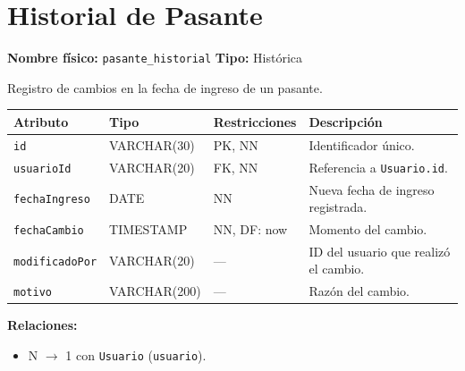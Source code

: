 \documentclass[12pt,a4paper]{article}
\newenvironment{tabladesc}[3]{%
  \section{#1}
  \textbf{Nombre físico:} \texttt{#2} \hfill \textbf{Tipo:} #3\par
  \medskip
}{%
  \bigskip
}
\begin{document}
\begin{tabladesc}{Historial de Pasante}{pasante\_historial}{Histórica}

Registro de cambios en la fecha de ingreso de un pasante.

\bigskip
\begin{longtable}{L{3.5cm} L{2.5cm} L{2cm} L{7.5cm}}
\toprule
\textbf{Atributo} & \textbf{Tipo} & \textbf{Restricciones} & \textbf{Descripción} \\
\midrule
\endhead
\bottomrule
\endfoot
\texttt{id}          & VARCHAR(30) & PK, NN & Identificador único. \\
\texttt{usuarioId}   & VARCHAR(20) & FK, NN & Referencia a \texttt{Usuario.id}. \\
\texttt{fechaIngreso}& DATE        & NN     & Nueva fecha de ingreso registrada. \\
\texttt{fechaCambio} & TIMESTAMP   & NN, DF: now & Momento del cambio. \\
\texttt{modificadoPor}& VARCHAR(20)& ---    & ID del usuario que realizó el cambio. \\
\texttt{motivo}      & VARCHAR(200)& ---    & Razón del cambio. \\
\bottomrule
\end{longtable}

\textbf{Relaciones:}
\begin{itemize}[nosep]
  \item N $\rightarrow$ 1 con \texttt{Usuario} (\texttt{usuario}).
\end{itemize}
\end{tabladesc}
\end{document}
